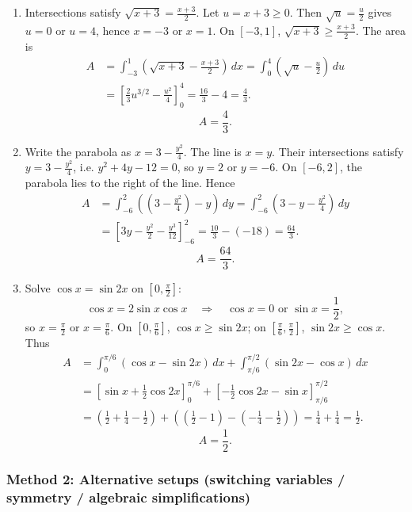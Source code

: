 \documentclass[12pt]{article}
\begin{document}
\begin{enumerate}[label=(\alph*)]
\item Intersections satisfy \(\sqrt{x+3}=\frac{x+3}{2}\). Let \(u=x+3\ge 0\). Then \(\sqrt{u}=\frac{u}{2}\) gives \(u=0\) or \(u=4\), hence \(x=-3\) or \(x=1\).
On \([-3,1]\), \(\sqrt{x+3}\ge \frac{x+3}{2}\). The area is
\begin{align*}
A
&=\int_{-3}^{1}\left(\sqrt{x+3}-\frac{x+3}{2}\right)\,dx
=\int_{0}^{4}\left(\sqrt{u}-\frac{u}{2}\right)\,du\\
&=\left[\frac{2}{3}u^{3/2}-\frac{u^2}{4}\right]_{0}^{4}
=\frac{16}{3}-4=\frac{4}{3}.
\end{align*}
\[
\boxed{A=\frac{4}{3}.}
\]

\item Write the parabola as \(x = 3-\frac{y^2}{4}\). The line is \(x=y\).
Their intersections satisfy \(y=3-\frac{y^2}{4}\), i.e.
\(y^2+4y-12=0\), so \(y=2\) or \(y=-6\).
On \([-6,2]\), the parabola lies to the right of the line. Hence
\begin{align*}
A
&=\int_{-6}^{2}\left(\left(3-\frac{y^2}{4}\right)-y\right)\,dy
=\int_{-6}^{2}\left(3-y-\frac{y^2}{4}\right)\,dy\\
&=\left[3y-\frac{y^2}{2}-\frac{y^3}{12}\right]_{-6}^{2}
=\frac{10}{3}-(-18)=\frac{64}{3}.
\end{align*}
\[
\boxed{A=\frac{64}{3}.}
\]

\item Solve \(\cos x=\sin 2x\) on \([0,\frac{\pi}{2}]\):
\[
\cos x = 2\sin x\cos x \quad\Rightarrow\quad
\cos x=0 \text{ or } \sin x=\frac12,
\]
so \(x=\frac{\pi}{2}\) or \(x=\frac{\pi}{6}\).
On \([0,\frac{\pi}{6}]\), \(\cos x \ge \sin 2x\); on \([\frac{\pi}{6},\frac{\pi}{2}]\), \(\sin 2x \ge \cos x\).
Thus
\begin{align*}
A
&=\int_{0}^{\pi/6}(\cos x-\sin 2x)\,dx
+\int_{\pi/6}^{\pi/2}(\sin 2x-\cos x)\,dx\\
&=\left[\sin x+\frac12\cos 2x\right]_{0}^{\pi/6}
+\left[-\frac12\cos 2x-\sin x\right]_{\pi/6}^{\pi/2}\\
&=\left(\frac12+\frac14-\frac12\right)+\left(\left(\frac12-1\right)-\left(-\frac14-\frac12\right)\right)
=\frac14+\frac14=\frac12.
\end{align*}
\[
\boxed{A=\frac12.}
\]
\end{enumerate}

\subsubsection*{Method 2: Alternative setups (switching variables / symmetry / algebraic simplifications)}
\end{document}
